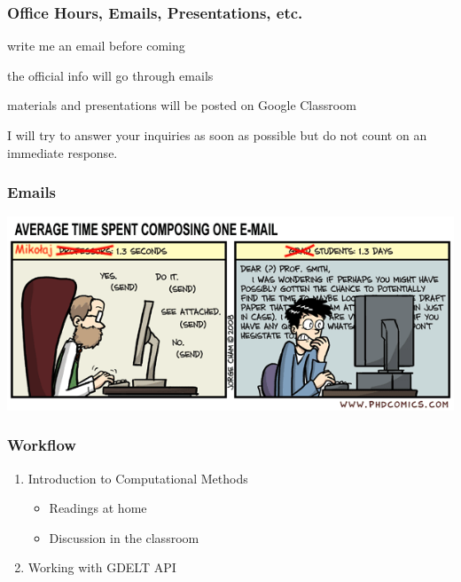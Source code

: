 \documentclass[aspectratio=169]{beamer}
\begin{document}
\begin{frame}
    \frametitle{Office Hours, Emails, Presentations, etc.}
    \begin{description}
        \item [Office Hours:] write me an email before coming
        \item [Emails:] the official info will go through emails
        \item [Google Classroom:] materials and presentations will be posted on
        Google Classroom
    \end{description}
    \alert{I will try to answer your inquiries as soon as possible but do not
    count on an immediate response.}
\end{frame}
\begin{frame}
    \frametitle{Emails}
        \includegraphics[width = \textwidth]{emails.png}
\end{frame}
\begin{frame}
    \frametitle{Workflow}
    \begin{enumerate}
        \item Introduction to Computational Methods
        \begin{itemize}
            \item Readings at home
            \item Discussion in the classroom
        \end{itemize}
        \item Working with GDELT API
    \end{enumerate}
\end{frame}
\end{document}

